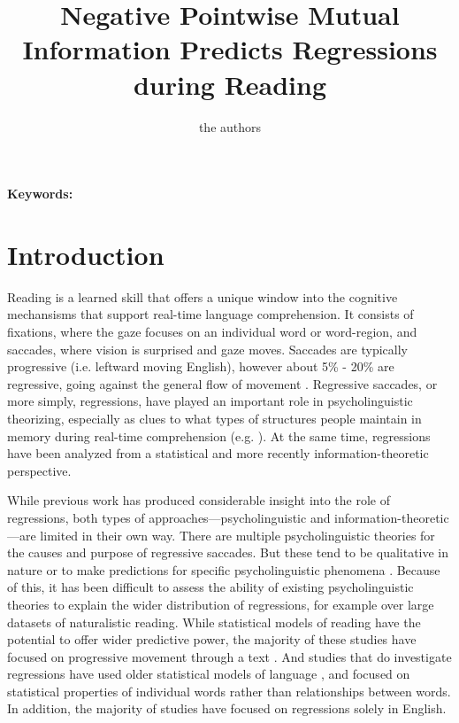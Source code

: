 \documentclass[12pt]{article}
\title{Negative Pointwise Mutual Information Predicts Regressions during Reading}
\author{the authors}
\date{}
\begin{document}
\maketitle


\begin{abstract}
\end{abstract}

\textbf{Keywords:} 

\section{Introduction}

Reading is a learned skill that offers a unique window into the cognitive mechansisms that support real-time language comprehension. It consists of fixations, where the gaze focuses on an individual word or word-region, and saccades, where vision is surprised and gaze moves. Saccades are typically progressive (i.e. leftward moving English), however about 5\% - 20\% are regressive, going against the general flow of movement \citep{rayner1998eye}. Regressive saccades, or more simply, regressions, have played an important role in psycholinguistic theorizing, especially as clues to what types of structures people maintain in memory during real-time comprehension (e.g. \citet{jurafsky1996probabilistic}). At the same time, regressions have been analyzed from a statistical \citep{vitu2000regressive, rayner2004effects, kliegl2004length} and more recently information-theoretic \citep{bicknell2011readers, lopopolo2019dependency} perspective. 

While previous work has produced considerable insight into the role of regressions, both types of approaches---psycholinguistic and information-theoretic---are limited in their own way. There are multiple psycholinguistic theories for the causes and purpose of regressive saccades. But these tend to be qualitative in nature \citep{kennedy1987spatial, kennedy2003reader} or to make predictions for specific psycholinguistic phenomena \citep{christianson2017reread}. Because of this, it has been difficult to assess the ability of existing psycholinguistic theories to explain the wider distribution of regressions, for example over large datasets of naturalistic reading. While statistical models of reading have the potential to offer wider predictive power, the majority of these studies have focused on progressive movement through a text \citep{}. And studies that do investigate regressions have used older statistical models of language \citep{bicknell2011readers}, and focused on statistical properties of individual words rather than relationships between words. In addition, the majority of studies have focused on regressions solely in English.
\end{document}
